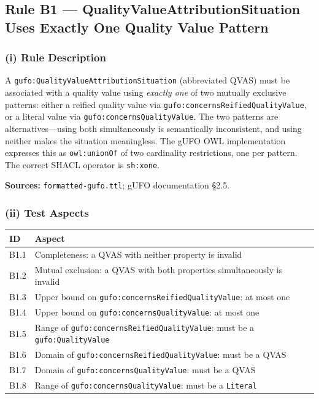 \documentclass[12pt,a4paper]{article}
\newcommand{\gufoclass}[1]{\nolinkurl{gufo:#1}}
\newcommand{\gufoprop}[1]{\nolinkurl{gufo:#1}}
\newcommand{\shprop}[1]{\nolinkurl{sh:#1}}
\begin{document}
\subsection{Rule B1 --- QualityValueAttributionSituation Uses Exactly One Quality Value Pattern}
\label{sec:rule-b1}

\subsubsection*{(i) Rule Description}

A \gufoclass{QualityValueAttributionSituation} (abbreviated QVAS) must be
associated with a quality value using \emph{exactly one} of two mutually
exclusive patterns: either a reified quality value via
\gufoprop{concernsReifiedQualityValue}, or a literal value via
\gufoprop{concernsQualityValue}. The two patterns are alternatives---using both
simultaneously is semantically inconsistent, and using neither makes the
situation meaningless. The gUFO OWL implementation expresses this as
\nolinkurl{owl:unionOf} of two cardinality restrictions, one per pattern. The
correct SHACL operator is \shprop{xone}.

\textbf{Sources:} \texttt{formatted-gufo.ttl}; gUFO documentation \S2.5.

\subsubsection*{(ii) Test Aspects}

\begin{tabular}{lL{9.5cm}}
  \toprule
  \textbf{ID} & \textbf{Aspect} \\
  \midrule
  B1.1 & Completeness: a QVAS with neither property is invalid \\
  B1.2 & Mutual exclusion: a QVAS with both properties simultaneously is invalid \\
  B1.3 & Upper bound on \gufoprop{concernsReifiedQualityValue}: at most one \\
  B1.4 & Upper bound on \gufoprop{concernsQualityValue}: at most one \\
  B1.5 & Range of \gufoprop{concernsReifiedQualityValue}: must be a \gufoclass{QualityValue} \\
  B1.6 & Domain of \gufoprop{concernsReifiedQualityValue}: must be a QVAS \\
  B1.7 & Domain of \gufoprop{concernsQualityValue}: must be a QVAS \\
  B1.8 & Range of \gufoprop{concernsQualityValue}: must be a \texttt{Literal} \\
  \bottomrule
\end{tabular}
\end{document}
